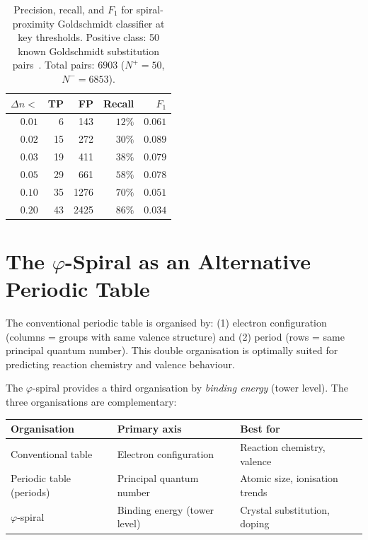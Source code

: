 \documentclass[11pt,a4paper]{article}
\theoremstyle{definition}
\theoremstyle{remark}
\newcommand{\vp}{\varphi}
\begin{document}
\begin{table}[h]
\centering
\caption{Precision, recall, and $F_1$ for spiral-proximity Goldschmidt
  classifier at key thresholds.
  Positive class: 50 known Goldschmidt substitution pairs~\cite{Goldschmidt1937,Burns1967}.
  Total pairs: $6903$ ($N^+=50$, $N^-=6853$).}
\label{P11:tab:auc_thresholds}
\begin{tabular}{rrrrr}
\toprule
$\Delta n <$ & TP & FP & Recall & $F_1$ \\
\midrule
$0.01$ &  6 &  143 & $12\%$ & $0.061$ \\
$0.02$ & 15 &  272 & $30\%$ & $0.089$ \\
$0.03$ & 19 &  411 & $38\%$ & $0.079$ \\
$0.05$ & 29 &  661 & $58\%$ & $0.078$ \\
$0.10$ & 35 & 1276 & $70\%$ & $0.051$ \\
$0.20$ & 43 & 2425 & $86\%$ & $0.034$ \\
\bottomrule
\end{tabular}
\end{table}


\section{The $\vp$-Spiral as an Alternative Periodic Table}
\label{P11:sec:alt_table}

The conventional periodic table is organised by:
(1) electron configuration (columns = groups with same valence structure)
and (2) period (rows = same principal quantum number).
This double organisation is optimally suited for predicting
reaction chemistry and valence behaviour.

The $\vp$-spiral provides a third organisation by
\emph{binding energy} (tower level).
The three organisations are complementary:

\begin{center}
\begin{tabular}{lll}
\toprule
Organisation & Primary axis & Best for \\
\midrule
Conventional table & Electron configuration & Reaction chemistry, valence \\
Periodic table (periods) & Principal quantum number & Atomic size, ionisation trends \\
$\vp$-spiral & Binding energy (tower level) & Crystal substitution, doping \\
\bottomrule
\end{tabular}
\end{center}
\end{document}
